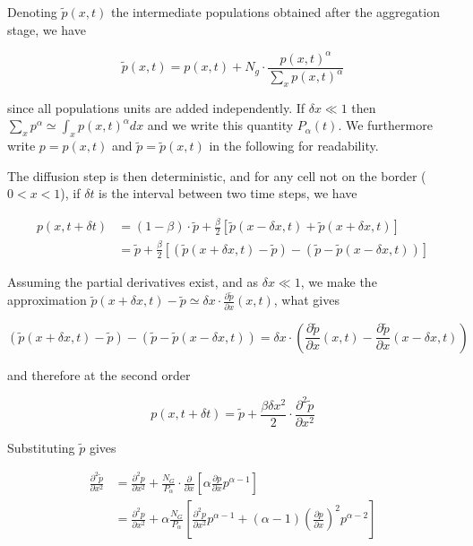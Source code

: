 Denoting $\tilde{p}(x,t)$ the intermediate populations obtained after the aggregation stage, we have

\[
\tilde{p}(x,t) = p(x,t) + N_g\cdot \frac{p(x,t)^{\alpha}}{\sum_x p(x,t)^{\alpha}}
\]

since all populations units are added independently. If $\delta x \ll 1$ then $\sum_x p^{\alpha} \simeq \int_x p(x,t)^{\alpha}dx$ and we write this quantity $P_{\alpha}(t)$. We furthermore write $p=p(x,t)$ and $\tilde{p} = \tilde{p}(x,t)$ in the following for readability.

The diffusion step is then deterministic, and for any cell not on the border ($0<x<1$), if $\delta t$ is the interval between two time steps, we have

\[
\begin{split}
p(x,t+\delta t) & = (1 - \beta) \cdot \tilde{p} + \frac{\beta}{2} \left[\tilde{p}(x-\delta x,t) + \tilde{p}(x+\delta x,t)\right]\\
& = \tilde{p} + \frac{\beta}{2} \left[\left(\tilde{p}(x+\delta x,t) - \tilde{p}\right) - \left(\tilde{p} - \tilde{p}(x-\delta x,t)\right)\right]
\end{split}
\]

Assuming the partial derivatives exist, and as $\delta x \ll 1$, we make the approximation $\tilde{p}(x+\delta x,t) - \tilde{p} \simeq \delta x\cdot \frac{\partial \tilde{p}}{\partial{x}}(x,t)$, what gives 

\[
\left(\tilde{p}(x+\delta x,t) - \tilde{p}\right) - \left(\tilde{p} - \tilde{p}(x-\delta x,t)\right) = \delta x \cdot \left(\frac{\partial \tilde{p}}{\partial{x}}(x,t) - \frac{\partial \tilde{p}}{\partial{x}}(x - \delta x,t)\right)
\]

and therefore at the second order

\[
p(x,t+\delta t) = \tilde{p} + \frac{\beta \delta x^2}{2} \cdot \frac{\partial^2 \tilde{p}}{\partial x^2}
\]

Substituting $\tilde{p}$ gives

\[
\begin{split}
\frac{\partial^2 \tilde{p}}{\partial x^2} & = \frac{\partial^2 p}{\partial x^2} + \frac{N_G}{P_\alpha}\cdot \frac{\partial}{\partial x}\left[\alpha \frac{\partial p}{\partial x} p^{\alpha - 1}\right]\\
& = \frac{\partial^2 p}{\partial x^2} + \alpha \frac{N_G}{P_\alpha} \left[\frac{\partial^2 p}{\partial x^2} p^{\alpha - 1} + (\alpha - 1) \left( \frac{\partial p}{\partial x}\right)^2 p^{\alpha - 2}\right]
\end{split}
\]

